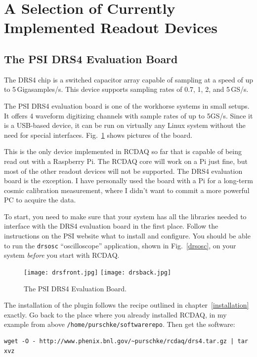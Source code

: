 \documentclass{article}[11pt]
\begin{document}
\section{A Selection of Currently Implemented Readout Devices}

\subsection{The PSI DRS4 Evaluation Board}
\label{instructions}

The DRS4 chip is a switched capacitor array capable of sampling at a
speed of up to 5\,Gigasamples/s. This device supports sampling rates
of 0.7, 1, 2, and 5\,GS/s. 

The PSI DRS4 evaluation board is one of the workhorse systems in small
setups. It offers 4 waveform digitizing channels with sample rates of
up to 5GS/s. Since it is a USB-based device, it can be run on
virtually any Linux system without the need for special
interfaces. Fig.~\ref{drsevalboard} shows pictures of the board.

This is the only device implemented in RCDAQ so far that is capable of
being read out with a Raspberry Pi. The RCDAQ core will work on a Pi
just fine, but most of the other readout devices will not be
supported. The DRS4 evaluation board is the exception. I have
personally used the board with a Pi for a long-term cosmic calibration
measurement, where I didn't want to commit a more powerful PC to
acquire the data.

To start, you need to make sure that your system has all the libraries
needed to interface with the DRS4 evaluation board in the first
place. Follow the instructions on the PSI website what to install and
configure.  You should be able to run the \verb|drsosc|
``oscilloscope'' application, shown in Fig.~\ref{drsosc}, on your
system \emph{before} you start with RCDAQ.

\begin{figure}
  \centering
  \texttt{[image: drsfront.jpg]}
  \texttt{[image: drsback.jpg]}
  \caption{\label{drsevalboard}The PSI DRS4 Evaluation Board.}
\end{figure}

The installation of the plugin follows the recipe outlined in
chapter~\ref{installation} exactly. Go back to the place where you
already installed RCDAQ, in my example from above
\verb|/home/purschke/softwarerepo|. Then get the software:

\begin{verbatim}
wget -O - http://www.phenix.bnl.gov/~purschke/rcdaq/drs4.tar.gz | tar xvz
\end{verbatim}
\end{document}
